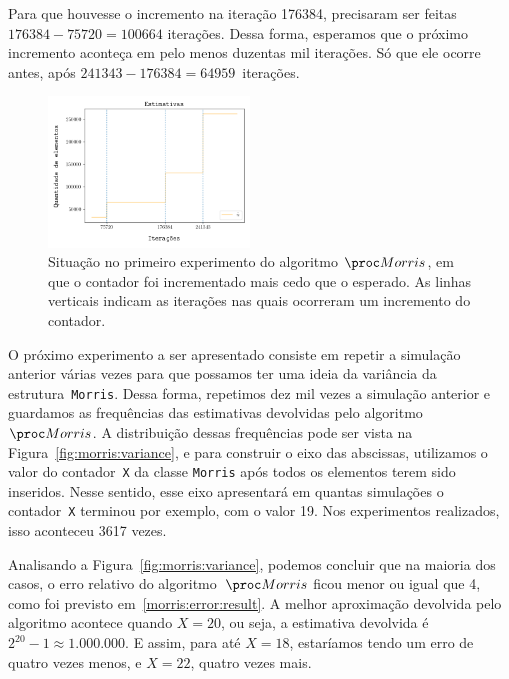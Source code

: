 Para que houvesse o incremento na iteração 176384, precisaram ser feitas $176384 - 75720 = 100664$ iterações. Dessa 
forma, esperamos que o próximo incremento aconteça em pelo menos duzentas mil iterações. Só que ele ocorre antes, após 
$241343 - 176384 = 64959$~iterações.

\begin{figure}[h]
  \centering
  \includegraphics[height=4cm, width=.5\textwidth]{figuras/morris_interval.png}
	\caption{Situação no primeiro experimento do algoritmo $\Morris$, em que o contador foi incrementado mais cedo que o 
  esperado. As linhas verticais indicam as iterações nas quais ocorreram um incremento do contador. }
  \label{fig:morris:interval}
\end{figure}

\newpage
O próximo experimento a ser apresentado consiste em repetir a simulação anterior várias vezes para que possamos ter uma 
ideia da variância da estrutura~\texttt{Morris}. Dessa forma, repetimos dez mil vezes a simulação anterior e guardamos 
as frequências das estimativas devolvidas pelo algoritmo~$\Morris$. A distribuição dessas frequências pode ser vista na 
Figura~\ref{fig:morris:variance}, e para construir o eixo das abscissas, utilizamos o valor do contador~\texttt{X} da 
classe \texttt{Morris} após todos os elementos terem sido inseridos. Nesse sentido, esse eixo apresentará em quantas 
simulações o contador~\texttt{X} terminou por exemplo, com o valor 19. Nos experimentos realizados, isso aconteceu 3617 
vezes.

Analisando a Figura~\ref{fig:morris:variance}, podemos concluir que na maioria dos casos, o erro relativo do 
algoritmo~$\Morris$ ficou menor ou igual que 4, como foi previsto em~\eqref{morris:error:result}. A melhor aproximação 
devolvida pelo algoritmo acontece quando $X = 20$, ou seja, a estimativa devolvida é $2^{20} - 1 \approx 1.000.000$. E 
assim, para até $X = 18$, estaríamos tendo um erro de quatro vezes menos, e $X = 22$, quatro vezes mais.

